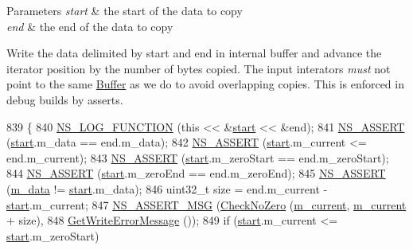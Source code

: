 \begin{DoxyParams}{Parameters}
{\em start} & the start of the data to copy \\
\hline
{\em end} & the end of the data to copy\\
\hline
\end{DoxyParams}
Write the data delimited by start and end in internal buffer and advance the iterator position by the number of bytes copied. The input interators {\itshape must} not point to the same \hyperlink{classns3_1_1Buffer}{Buffer} as we do to avoid overlapping copies. This is enforced in debug builds by asserts. 
\begin{DoxyCode}
839 \{
840   \hyperlink{log-macros-disabled_8h_a90b90d5bad1f39cb1b64923ea94c0761}{NS\_LOG\_FUNCTION} (\textcolor{keyword}{this} << &\hyperlink{namespacevisualizer_1_1core_a2a35e5d8a34af358b508dac8635754e0}{start} << &end);
841   \hyperlink{assert_8h_a6dccdb0de9b252f60088ce281c49d052}{NS\_ASSERT} (\hyperlink{namespacevisualizer_1_1core_a2a35e5d8a34af358b508dac8635754e0}{start}.m\_data == end.m\_data);
842   \hyperlink{assert_8h_a6dccdb0de9b252f60088ce281c49d052}{NS\_ASSERT} (\hyperlink{namespacevisualizer_1_1core_a2a35e5d8a34af358b508dac8635754e0}{start}.m\_current <= end.m\_current);
843   \hyperlink{assert_8h_a6dccdb0de9b252f60088ce281c49d052}{NS\_ASSERT} (\hyperlink{namespacevisualizer_1_1core_a2a35e5d8a34af358b508dac8635754e0}{start}.m\_zeroStart == end.m\_zeroStart);
844   \hyperlink{assert_8h_a6dccdb0de9b252f60088ce281c49d052}{NS\_ASSERT} (\hyperlink{namespacevisualizer_1_1core_a2a35e5d8a34af358b508dac8635754e0}{start}.m\_zeroEnd == end.m\_zeroEnd);
845   \hyperlink{assert_8h_a6dccdb0de9b252f60088ce281c49d052}{NS\_ASSERT} (\hyperlink{classns3_1_1Buffer_1_1Iterator_a406cd27bb4983e8ba23542eadbc9330b}{m\_data} != \hyperlink{namespacevisualizer_1_1core_a2a35e5d8a34af358b508dac8635754e0}{start}.m\_data);
846   uint32\_t size = end.m\_current - \hyperlink{namespacevisualizer_1_1core_a2a35e5d8a34af358b508dac8635754e0}{start}.m\_current;
847   \hyperlink{assert_8h_aff5ece9066c74e681e74999856f08539}{NS\_ASSERT\_MSG} (\hyperlink{classns3_1_1Buffer_1_1Iterator_a0e3ce8d8b629c64493095486d4408ffd}{CheckNoZero} (\hyperlink{classns3_1_1Buffer_1_1Iterator_a762e0242d60f4d717158d0584e4accd6}{m\_current}, 
      \hyperlink{classns3_1_1Buffer_1_1Iterator_a762e0242d60f4d717158d0584e4accd6}{m\_current} + size),
848                  \hyperlink{classns3_1_1Buffer_1_1Iterator_ae37b790336264f34d65971231c3ed1f1}{GetWriteErrorMessage} ());
849   \textcolor{keywordflow}{if} (\hyperlink{namespacevisualizer_1_1core_a2a35e5d8a34af358b508dac8635754e0}{start}.m\_current <= \hyperlink{namespacevisualizer_1_1core_a2a35e5d8a34af358b508dac8635754e0}{start}.m\_zeroStart)

\end{DoxyCode}
